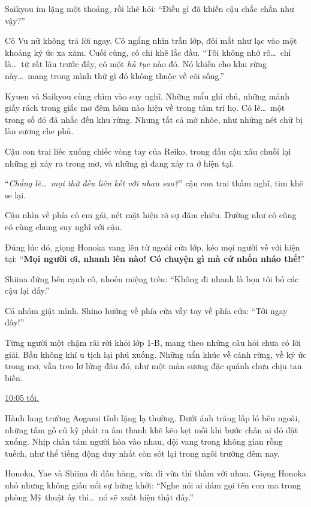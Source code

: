 \documentclass[../main.tex]{subfiles}
\begin{document}
Saikyou im lặng một thoáng, rồi khẽ hỏi: ``Điều gì đã khiến cậu chắc chắn như vậy?''

Cô Vu nữ không trả lời ngay. Cô ngẩng nhìn trần lớp, đôi mắt như lạc vào một khoảng ký ức xa xăm. Cuối cùng, cô chỉ khẽ lắc đầu. ``Tôi không nhớ rõ\dots\ chỉ là\dots\ từ rất lâu trước đây, có một \emph{hủ tục} nào đó. Nó khiến cho khu rừng này\dots\ mang trong mình thứ gì đó không thuộc về cõi sống.''

Kyuen và Saikyou cùng chìm vào suy nghĩ. Những mẩu ghi chú, những mảnh giấy rách trong giấc mơ đêm hôm nào hiện về trong tâm trí họ. Có lẽ\dots\ một trong số đó đã nhắc đến khu rừng. Nhưng tất cả mờ nhòe, như những nét chữ bị làn sương che phủ.

Cậu con trai liếc xuống chiếc vòng tay của Reiko, trong đầu cậu xâu chuỗi lại những gì xảy ra trong mơ, và những gì đang xảy ra ở hiện tại.

``\textit{Chẳng lẽ\dots\ mọi thứ đều liên kết với nhau sao?}'' cậu con trai thầm nghĩ, tim khẽ se lại.

Cậu nhìn về phía cô em gái, nét mặt hiện rõ sự đăm chiêu. Dường như cô cũng có cùng chung suy nghĩ với cậu.

Đúng lúc đó, giọng Honoka vang lên từ ngoài cửa lớp, kéo mọi người về với hiện tại: ``\textbf{Mọi người ơi, nhanh lên nào! Có chuyện gì mà cứ nhốn nháo thế!}''

Shiina đứng bên cạnh cô, nhoẻn miệng trêu: ``Không đi nhanh là bọn tôi bỏ các cậu lại đấy.''

Cả nhóm giật mình. Shino hướng về phía cửa vẫy tay về phía cửa: ``Tới ngay đây!''

Từng người một chậm rãi rời khỏi lớp 1-B, mang theo những câu hỏi chưa có lời giải. Bầu không khí u tịch lại phủ xuống. Những uẩn khúc về cánh rừng, về ký ức trong mơ, vẫn treo lơ lửng đâu đó, như một màn sương đặc quánh chưa chịu tan biến.

\begin{center}
  \uline{10:05 tối.}
\end{center}

Hành lang trường Aogami tĩnh lặng lạ thường. Dưới ánh trăng lấp ló bên ngoài, những tấm gỗ cũ kỹ phát ra âm thanh khẽ kẽo kẹt mỗi khi bước chân ai đó đặt xuống. Nhịp chân tám người hòa vào nhau, dội vang trong không gian rỗng tuếch, như thể tiếng động duy nhất còn sót lại trong ngôi trường đêm nay.

Honoka, Yae và Shiina đi đầu hàng, vừa đi vừa thì thầm với nhau. Giọng Honoka nhỏ nhưng không giấu nổi sự hứng khởi: ``Nghe nói ai dám gọi tên con ma trong phòng Mỹ thuật ấy thì\dots\ nó sẽ xuất hiện thật đấy.''
\end{document}
